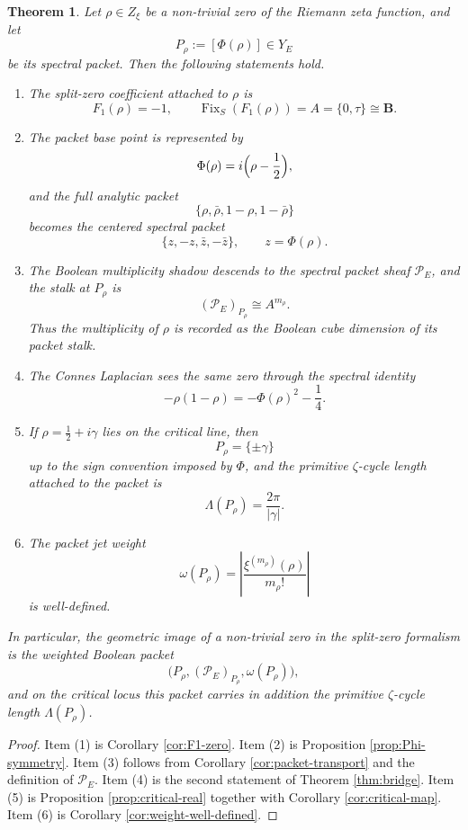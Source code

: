 \documentclass[11pt,a4paper]{article}
\newtheorem{theorem}{Theorem}[section]
\theoremstyle{definition}
\theoremstyle{remark}
\DeclareMathOperator{\Fix}{Fix}
\newcommand{\BB}{\mathbf B}
\newcommand{\cP}{\mathcal P}
\newcommand{\taup}{\tau}
\begin{document}
\begin{theorem}\label{thm:main}
Let $\rho\in Z_\xi$ be a non-trivial zero of the Riemann zeta function, and let
\[
P_\rho:=[\Phi(\rho)]\in Y_E
\]
be its spectral packet.
Then the following statements hold.

\begin{enumerate}[label=(\arabic*)]
\item The split-zero coefficient attached to $\rho$ is
\[
F_1(\rho)=-1,
\qquad
\Fix_S(F_1(\rho))=A=\{0,\taup\}\cong\BB.
\]

\item The packet base point is represented by
\[
\Phi(\rho)=i\Bigl(\rho-\frac12\Bigr),
\]
and the full analytic packet
\[
\{\rho,\bar\rho,1-\rho,1-\bar\rho\}
\]
becomes the centered spectral packet
\[
\{z,-z,\bar z,-\bar z\},
\qquad z=\Phi(\rho).
\]

\item The Boolean multiplicity shadow descends to the spectral packet sheaf $\cP_E$, and the stalk at $P_\rho$ is
\[
(\cP_E)_{P_\rho}\cong A^{m_\rho}.
\]
Thus the multiplicity of $\rho$ is recorded as the Boolean cube dimension of its packet stalk.

\item The Connes Laplacian sees the same zero through the spectral identity
\[
-\rho(1-\rho)=-\Phi(\rho)^2-\frac14.
\]

\item If $\rho=\frac12+i\gamma$ lies on the critical line, then
\[
P_\rho=\{\pm\gamma\}
\]
up to the sign convention imposed by $\Phi$, and the primitive $\zeta$-cycle length attached to the packet is
\[
\Lambda(P_\rho)=\frac{2\pi}{|\gamma|}.
\]

\item The packet jet weight
\[
\omega(P_\rho)=\left|\frac{\xi^{(m_\rho)}(\rho)}{m_\rho!}\right|
\]
is well-defined.
\end{enumerate}

In particular, the geometric image of a non-trivial zero in the split-zero formalism is the weighted Boolean packet
\[
\bigl(P_\rho,(\cP_E)_{P_\rho},\omega(P_\rho)\bigr),
\]
and on the critical locus this packet carries in addition the primitive $\zeta$-cycle length $\Lambda(P_\rho)$.
\end{theorem}

\begin{proof}
Item (1) is Corollary \ref{cor:F1-zero}.  Item (2) is Proposition \ref{prop:Phi-symmetry}.  Item (3) follows from Corollary \ref{cor:packet-transport} and the definition of $\cP_E$.  Item (4) is the second statement of Theorem \ref{thm:bridge}.  Item (5) is Proposition \ref{prop:critical-real} together with Corollary \ref{cor:critical-map}.  Item (6) is Corollary \ref{cor:weight-well-defined}.
\end{proof}
\end{document}
